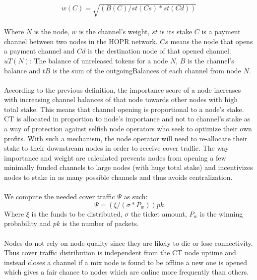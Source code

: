 $$w(C) = \sqrt{(B(C) / st(Cs) * st(Cd))}$$
\\
Where $N$ is the node, $w$ is the channel's weight, $st$ is its stake $C$ is a payment channel between two nodes in the HOPR network. $Cs$ means the node that opens a payment channel and 
$Cd$ is the destination node of that opened channel. $uT(N)$: The balance of unreleased tokens for a node $N$, $B$ is the channel's balance and $tB$ is the sum of the outgoingBalances of each channel from node $N$.
\\~\\ According to the previous definition, the importance score of a node increases with increasing channel balances of that node towards other nodes with high total stake. This means that channel opening is proportional to a node’s stake. CT is allocated in proportion to node's importance and not to channel's stake as a way of protection against selfish node operators who seek to optimize their own profits.
With such a mechanism, the node operator will need to re-allocate their stake to their downstream nodes in order to receive cover traffic. 
The way importance and weight are calculated prevents nodes from opening a few minimally funded channels to large nodes (with huge total stake) and incentivizes nodes to stake in as many possible channels and thus avoids centralization.
\\~\\ We compute the needed cover traffic $\Psi$ as such:
$$\Psi= ( \xi/ (\sigma * P_w)) pk$$
Where $\xi$ is the funds to be distributed, $\sigma$ the ticket amount, $P_w$ is the winning probability and $pk$ is the number of packets.
\\~\\Nodes do not rely on node quality since they are likely to die or lose connectivity. Thus cover traffic distribution is independent from the CT node uptime and instead closes a channel if a mix node is found to be offline a new one is opened which gives a fair chance to nodes which are online more frequently than others. 

